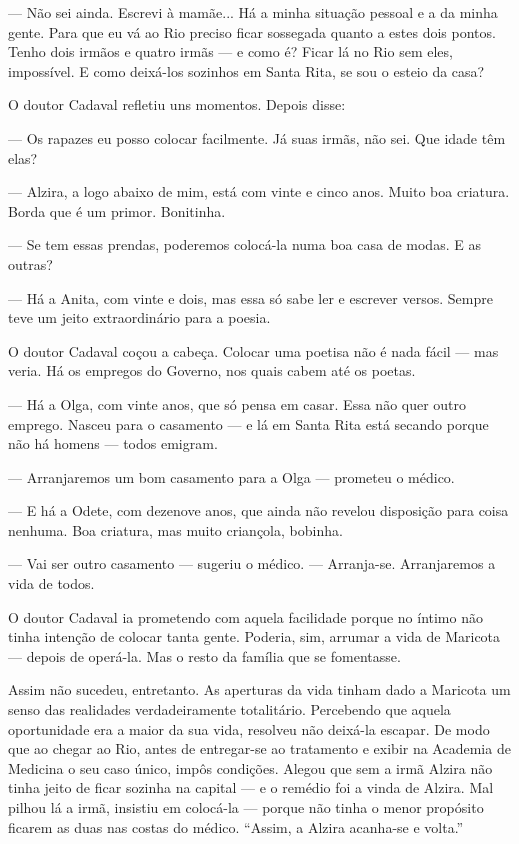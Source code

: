 --- Não sei ainda. Escrevi à mamãe... Há a minha situação pessoal e a da
minha gente. Para que eu vá ao Rio preciso ficar sossegada quanto a
estes dois pontos. Tenho dois irmãos e quatro irmãs --- e como é? Ficar
lá no Rio sem eles, impossível. E como deixá-los sozinhos em Santa Rita,
se sou o esteio da casa?

O doutor Cadaval refletiu uns momentos. Depois disse:

--- Os rapazes eu posso colocar facilmente. Já suas irmãs, não sei. Que
idade têm elas?

--- Alzira, a logo abaixo de mim, está com vinte e cinco anos. Muito boa
criatura. Borda que é um primor. Bonitinha.

--- Se tem essas prendas, poderemos colocá-la numa boa casa de modas. E
as outras?

--- Há a Anita, com vinte e dois, mas essa só sabe ler e escrever
versos. Sempre teve um jeito extraordinário para a poesia.

O doutor Cadaval coçou a cabeça. Colocar uma poetisa não é nada fácil
--- mas veria. Há os empregos do Governo, nos quais cabem até os poetas.

--- Há a Olga, com vinte anos, que só pensa em casar. Essa não quer
outro emprego. Nasceu para o casamento --- e lá em Santa Rita está
secando porque não há homens --- todos emigram.

--- Arranjaremos um bom casamento para a Olga --- prometeu o médico.

--- E há a Odete, com dezenove anos, que ainda não revelou disposição
para coisa nenhuma. Boa criatura, mas muito criançola, bobinha.

--- Vai ser outro casamento --- sugeriu o médico. --- Arranja-se.
Arranjaremos a vida de todos.

O doutor Cadaval ia prometendo com aquela facilidade porque no íntimo
não tinha intenção de colocar tanta gente. Poderia, sim, arrumar a vida
de Maricota --- depois de operá-la. Mas o resto da família que se
fomentasse.

Assim não sucedeu, entretanto. As aperturas da vida tinham dado a
Maricota um senso das realidades verdadeiramente totalitário. Percebendo
que aquela oportunidade era a maior da sua vida, resolveu não deixá-la
escapar. De modo que ao chegar ao Rio, antes de entregar-se ao
tratamento e exibir na Academia de Medicina o seu caso único, impôs
condições. Alegou que sem a irmã Alzira não tinha jeito de ficar sozinha
na capital --- e o remédio foi a vinda de Alzira. Mal pilhou lá a irmã,
insistiu em colocá-la --- porque não tinha o menor propósito ficarem as
duas nas costas do médico. ``Assim, a Alzira acanha-se e volta.''

